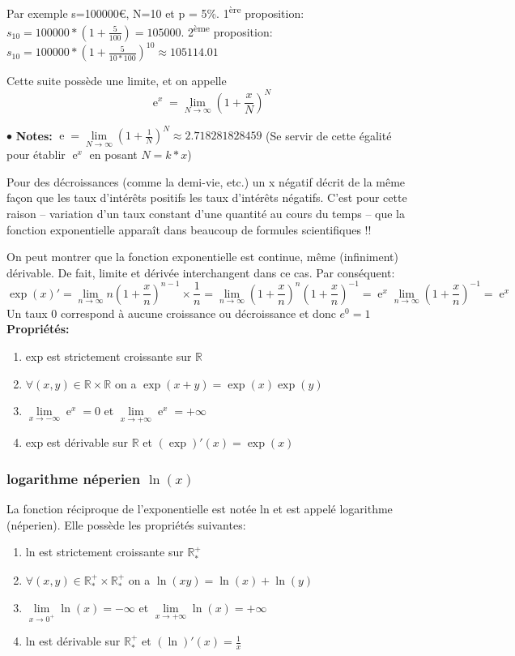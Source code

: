 \documentclass[a4paper]{article}
\theoremstyle{break}
\DeclareMathOperator{\e}{e} %
\newcommand{\R}{\mathbb{R}}
\newcommand{\note}{$\bullet$ \textbf{Notes: }}
\begin{document}
Par exemple s=100000\euro, N=10 et p = 5\%.  1\textsuperscript{ère}
proposition: $s_{10} =  100000 * (1+\frac{5}{100}) = 105000$. 2\textsuperscript{ème}
proposition: $s_{10} =  100000 * (1+\frac{5}{10*100})^{10} \approx
105114.01$

Cette suite possède une limite, et on appelle
\[
  \e^{x} = \lim \limits_{N \to \infty} (1 + \frac{x}{N})^N
\]

\note $\e = \lim \limits_{N \to \infty} (1 + \frac{1}{N})^N \approx
2.718281828459$ (Se servir de cette égalité pour établir $\e^{x}$ en
posant $N = k*x$)

Pour des décroissances (comme la demi-vie, etc.) un \og x
négatif \fg décrit de la même façon que les taux d'intérêts positifs
les taux d'intérêts négatifs. C'est pour cette raison -- variation
d'un taux constant d'une quantité au cours du temps -- que la fonction
exponentielle apparaît dans beaucoup de formules scientifiques !!

On peut montrer que la fonction exponentielle est continue, même
(infiniment) dérivable. De fait, limite et dérivée interchangent dans
ce cas. Par conséquent:
\[
  \exp(x)'
  = \lim \limits_{n \to \infty} n(1+\frac{x}{n})^{n-1} \times
  \frac{1}{n}
  = \lim \limits_{n \to \infty} (1+\frac{x}{n})^{n} 
  (1+\frac{x}{n})^{-1}
  = \e^{x} \lim \limits_{n \to \infty} (1+\frac{x}{n})^{-1}
  = \e^{x}
\]
Un taux 0 correspond à aucune croissance ou décroissance et donc
$e^0=1$
\newpage
\textbf{Propriétés: }
\begin{enumerate}[label=(\alph*), leftmargin =2cm]
\item exp est strictement croissante sur $\R$
\item $\forall (x,y) \in \R \times \R$ on a $\exp(x+y) = \exp(x) \exp(y)$
\item $\lim \limits_{x \to -\infty} \e^{x} = 0$ et $\lim \limits_{x \to +\infty} \e^{x} = +\infty$
\item exp est dérivable sur $\R$ et $(\exp)'(x) = \exp(x)$
\end{enumerate}

\subsubsection{logarithme néperien $\ln(x)$}
La fonction réciproque de l'exponentielle est notée ln et est appelé
logarithme (néperien). Elle possède les propriétés suivantes:
\begin{enumerate}[label=(\alph*), leftmargin =2cm]
\item ln est strictement croissante sur $\R^+_*$
\item $\forall (x,y) \in \R^+_* \times \R^+_*$ on a $\ln(xy) = \ln(x) +
  \ln(y)$
\item $\lim \limits_{x \to 0^+} \ln(x) = -\infty$ et $\lim \limits_{x
    \to +\infty} \ln(x) = +\infty$
\item ln est dérivable sur $\R^+_*$ et $(\ln)'(x) = \frac{1}{x}$
\end{enumerate}
\end{document}
